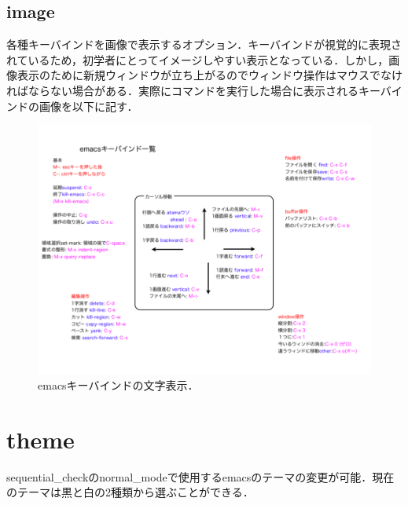 \subsection{image}\label{image}
各種キーバインドを画像で表示するオプション．キーバインドが視覚的に表現されているため，初学者にとってイメージしやすい表示となっている．しかし，画像表示のために新規ウィンドウが立ち上がるのでウィンドウ操作はマウスでなければならない場合がある．実際にコマンドを実行した場合に表示されるキーバインドの画像を以下に記す．
\begin{figure}[H]
\centering
\begin{center}
\includegraphics[width=150mm]{../../picture/keybind_image.png}
\end{center}
\caption{emacsキーバインドの文字表示．\label{keybind_image}}
\end{figure}

\section{theme}\label{theme}
sequential\_checkのnormal\_modeで使用するemacsのテーマの変更が可能．現在のテーマは黒と白の2種類から選ぶことができる．
